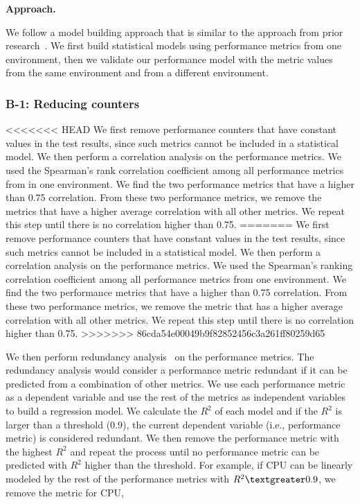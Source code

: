 \noindent \textbf{Approach. }

We follow a model building approach that is similar to the approach from prior research~\cite{Shang:2015:ADP:2668930.2688052,Cohen:2005:CIC:1095810.1095821,xiong2013vperfguard}. We first build statistical models using performance metrics from one environment, then we validate our performance model with the metric values from the same environment and from a different environment.
\subsubsection{B-1: Reducing counters}

<<<<<<< HEAD
We first remove performance counters that have constant values in the test results, since such metrics cannot be included in a statistical model. We then perform a correlation analysis on the performance metrics. We used the Spearman's rank correlation coefficient among all performance metrics from in one environment. We find the two performance metrics that have a higher than 0.75 correlation. From these two performance metrics, we remove the metrics that have a higher average correlation with all other metrics. We repeat this step until there is no correlation higher than 0.75.
=======
We first remove performance counters that have constant values in the test results, since such metrics cannot be included in a statistical model. We then perform a correlation analysis on the performance metrics. We used the Spearman's ranking correlation coefficient among all performance metrics from one environment. We find the two performance metrics that have a higher than 0.75 correlation. From these two performance metrics, we remove the metric that has a higher average correlation with all other metrics. We repeat this step until there is no correlation higher than 0.75.
>>>>>>> 86cda54e00049b9f82852456c3a261ff80259d65

We then perform redundancy analysis~\cite{harrell2001regression} on the performance metrics. The redundancy analysis would consider a performance metric redundant if it can be predicted from a combination of other metrics. We use each performance metric as a dependent variable and use the rest of the metrics as independent variables to build a regression model. We calculate the $R^2$ of each model and if the $R^2$ is larger than a threshold (0.9), the current dependent variable (i.e., performance metric) is considered redundant. We then remove the performance metric with the highest $R^2$ and repeat the process until no performance metric can be predicted with $R^2$ higher than the threshold. For example, if CPU can be linearly modeled by the rest of the performance metrics with $R^2\textgreater0.9$, we remove the metric for CPU, 

